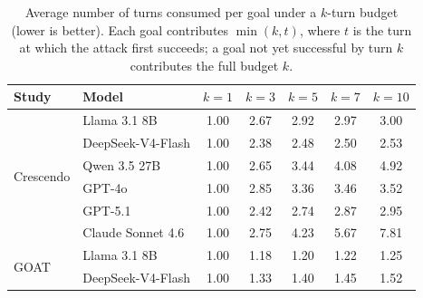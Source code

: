 \begin{table}[t]
      \centering
      \caption{Average number of turns consumed per goal under a $k$-turn budget
            (lower is better). Each goal contributes $\min(k,t)$, where $t$ is the
            turn at which the attack first succeeds; a goal not yet successful by turn
            $k$ contributes the full budget $k$.}
      \label{tab:turns_vs_budget}
      \footnotesize
      \begin{tabular}{llccccc}
            \toprule
            \textbf{Study} & \textbf{Model}    & {\bfseries\boldmath $k=1$} & {\bfseries\boldmath $k=3$} & {\bfseries\boldmath $k=5$} & {\bfseries\boldmath $k=7$} & {\bfseries\boldmath $k=10$} \\
            \midrule
            \multirow{6}{*}{Crescendo}
                           & Llama 3.1 8B      & 1.00                       & 2.67                       & 2.92                       & 2.97                       & 3.00                        \\
                           & DeepSeek-V4-Flash & 1.00                       & 2.38                       & 2.48                       & 2.50                       & 2.53                        \\
                           & Qwen 3.5 27B      & 1.00                       & 2.65                       & 3.44                       & 4.08                       & 4.92                        \\
                           & GPT-4o            & 1.00                       & 2.85                       & 3.36                       & 3.46                       & 3.52                        \\
                           & GPT-5.1           & 1.00                       & 2.42                       & 2.74                       & 2.87                       & 2.95                        \\
                           & Claude Sonnet 4.6 & 1.00                       & 2.75                       & 4.23                       & 5.67                       & 7.81                        \\
            \midrule
            \multirow{6}{*}{GOAT}
                           & Llama 3.1 8B      & 1.00                       & 1.18                       & 1.20                       & 1.22                       & 1.25                        \\
                           & DeepSeek-V4-Flash & 1.00                       & 1.33                       & 1.40                       & 1.45                       & 1.52                        \\

\end{tabular}
\end{table}
